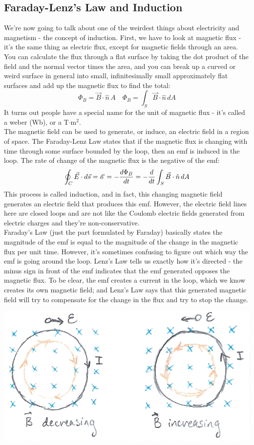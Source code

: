 \subsection{Faraday-Lenz's Law and Induction}
We're now going to talk about one of the weirdest things about electricity and magnetism - the concept of induction. First, we have to look at magnetic flux - it's the same thing as electric flux, except for magnetic fields through an area. You can calculate the flux through a flat surface by taking the dot product of the field and the normal vector times the area, and you can break up a curved or weird surface in general into small, infinitesimally small approximately flat surfaces and add up the magnetic flux to find the total:
\[
	\Phi_B = \vec B \cdot \hat n \, A \quad \Phi_B = \int_S \vec B \cdot \hat n \, dA
\] 
It turns out people have a special name for the unit of magnetic flux - it's called a weber (Wb), or a T$\cdot$m$^2$. \\
The magnetic field can be used to generate, or induce, an electric field in a region of space. The Faraday-Lenz Law states that if the magnetic flux is changing with time through some surface bounded by the loop, then an emf is induced in the loop. The rate of change of the magnetic flux is the negative of the emf:
\[
	\oint_C \vec E \cdot d\vec s = \mathscr{E} = -\frac{d \Phi_B}{d t} = -\frac{d }{d t} \int_S \vec B \cdot \hat n \, dA
\]
This process is called induction, and in fact, this changing magnetic field generates an electric field that produces this emf. However, the electric field lines here are closed loops and are not like the Coulomb electric fields generated from electric charges and they're non-conservative. \\
Faraday's Law (just the part formulated by Faraday) basically states the magnitude of the emf is equal to the magnitude of the change in the magnetic flux per unit time. However, it's sometimes confusing to figure out which way the emf is going around the loop. Lenz's Law tells us exactly how it's directed - the minus sign in front of the emf indicates that the emf generated opposes the magnetic flux. To be clear, the emf creates a current in the loop, which we know creates its own magnetic field; and Lenz's Law says that this generated magnetic field will try to compensate for the change in the flux and try to stop the change. \\
\begin{center}
	\includegraphics[scale=0.25]{images/em/faraday-lenz.png}
\end{center}
